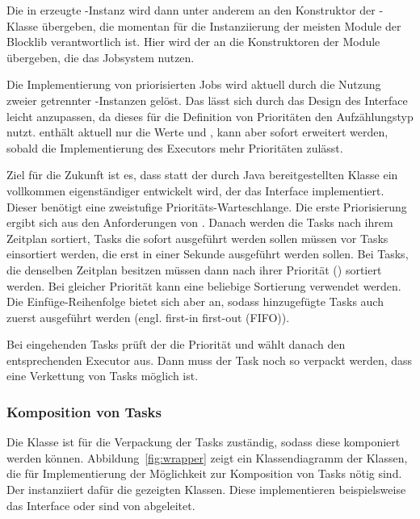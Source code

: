 Die in  erzeugte -Instanz wird dann unter anderem an den Konstruktor der -Klasse übergeben, die momentan für die Instanziierung der meisten Module der Blocklib verantwortlich ist. Hier wird der  an die Konstruktoren der Module übergeben, die das Jobsystem nutzen.

Die Implementierung von priorisierten Jobs wird aktuell durch die Nutzung zweier getrennter -Instanzen gelöst. Das lässt sich durch das Design des Interface  leicht anzupassen, da dieses für die Definition von Prioritäten den Aufzählungstyp  nutzt.  enthält aktuell nur die Werte  und , kann aber sofort erweitert werden, sobald die Implementierung des Executors mehr Prioritäten zulässt. 

Ziel für die Zukunft ist es, dass statt der durch Java bereitgestellten  Klasse ein vollkommen eigenständiger  entwickelt wird, der das Interface  implementiert. Dieser benötigt eine zweistufige Prioritäts-Warteschlange. Die erste Priorisierung ergibt sich aus den Anforderungen von . Danach werden die Tasks nach ihrem Zeitplan sortiert, Tasks die sofort ausgeführt werden sollen müssen vor Tasks einsortiert werden, die erst in einer Sekunde ausgeführt werden sollen. Bei Tasks, die denselben Zeitplan besitzen müssen dann nach ihrer Priorität () sortiert werden. Bei gleicher Priorität kann eine beliebige Sortierung verwendet werden. Die Einfüge-Reihenfolge bietet sich aber an, sodass hinzugefügte Tasks auch zuerst ausgeführt werden (engl. first-in first-out (FIFO)).

Bei eingehenden Tasks prüft der  die Priorität und wählt danach den entsprechenden Executor aus. Dann muss der Task noch so verpackt werden, dass eine Verkettung von Tasks möglich ist.

\subsubsection{Komposition von Tasks}\label{sec:Verkettung}
Die Klasse  ist für die Verpackung der Tasks zuständig, sodass diese komponiert werden können. Abbildung~\ref{fig:wrapper} zeigt ein Klassendiagramm der Klassen, die für Implementierung der Möglichkeit zur Komposition von Tasks nötig sind. Der  instanziiert dafür die gezeigten Klassen. Diese implementieren beispielsweise das Interface  oder sind von  abgeleitet.

